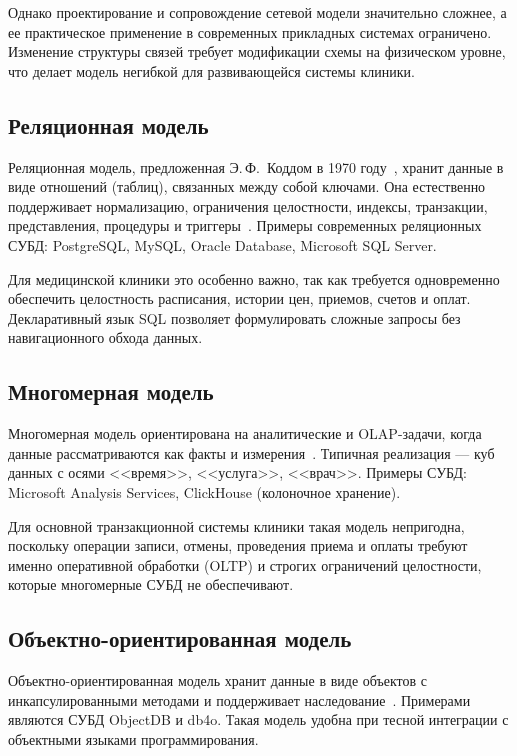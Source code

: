 Однако проектирование и сопровождение сетевой модели значительно сложнее, а ее практическое применение в современных прикладных системах ограничено. Изменение структуры связей требует модификации схемы на физическом уровне, что делает модель негибкой для развивающейся системы клиники.

\subsection{Реляционная модель}

Реляционная модель, предложенная Э.\,Ф.~Коддом в 1970 году~\cite{date_intro}, хранит данные в виде отношений (таблиц), связанных между собой ключами. Она естественно поддерживает нормализацию, ограничения целостности, индексы, транзакции, представления, процедуры и триггеры~\cite{connolly_db}. Примеры современных реляционных СУБД: PostgreSQL, MySQL, Oracle Database, Microsoft SQL Server.

Для медицинской клиники это особенно важно, так как требуется одновременно обеспечить целостность расписания, истории цен, приемов, счетов и оплат. Декларативный язык SQL позволяет формулировать сложные запросы без навигационного обхода данных.

\subsection{Многомерная модель}

Многомерная модель ориентирована на аналитические и OLAP-задачи, когда данные рассматриваются как факты и измерения~\cite{connolly_db}. Типичная реализация --- куб данных с осями <<время>>, <<услуга>>, <<врач>>. Примеры СУБД: Microsoft Analysis Services, ClickHouse (колоночное хранение).

Для основной транзакционной системы клиники такая модель непригодна, поскольку операции записи, отмены, проведения приема и оплаты требуют именно оперативной обработки (OLTP) и строгих ограничений целостности, которые многомерные СУБД не обеспечивают.

\subsection{Объектно-ориентированная модель}

Объектно-ориентированная модель хранит данные в виде объектов с инкапсулированными методами и поддерживает наследование~\cite{date_intro}. Примерами являются СУБД ObjectDB и db4o. Такая модель удобна при тесной интеграции с объектными языками программирования.

